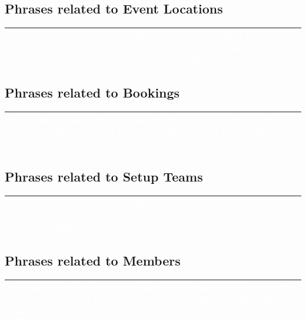 \documentclass[12pt,a4paper]{article}
\begin{document}
\subsection*{Phrases related to Event Locations}
\begin{center}
\renewcommand{\arraystretch}{1.5}
\small
\begin{tabular}{|p{}|}
\hline
\rowcolor[rgb]{0.1, 0.3, 0.5} \textcolor{white}{For each event location, we handle a code unique within the customer's profile. We track the address, setup time, and capacity. Every customer possesses one or more locations.} \\ \hline
\end{tabular}
\end{center}

\subsection*{Phrases related to Bookings}
\begin{center}
\renewcommand{\arraystretch}{1.5}
\small
\begin{tabular}{|p{}|}
\hline
\rowcolor[rgb]{0.1, 0.3, 0.5} \textcolor{white}{For bookings, we handle a unique ID, type, date, duration, and cost. For placement, we handle the mode \{Phone, Mail, Email, Website\}. Every booking takes place at one location.} \\ \hline
\end{tabular}
\end{center}

\subsection*{Phrases related to Setup Teams}
\begin{center}
\renewcommand{\arraystretch}{1.5}
\small
\begin{tabular}{|p{}|}
\hline
\rowcolor[rgb]{0.1, 0.3, 0.5} \textcolor{white}{For setup teams, we handle a unique code, a name, and the total number of installations made. Each team is managed by a specific Depot and handles bookings.} \\ \hline
\end{tabular}
\end{center}

\subsection*{Phrases related to Members}
\begin{center}
\renewcommand{\arraystretch}{1.5}
\small
\begin{tabular}{|p{}|}
\hline
\rowcolor[rgb]{0.1, 0.3, 0.5} \textcolor{white}{For members, we handle the name, surname, and fiscal code (CF). Setup teams consist of members, with a limit of 10 members per team.} \\ \hline
\end{tabular}
\end{center}
\end{document}
